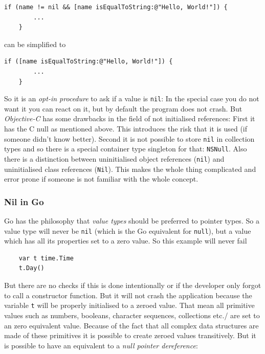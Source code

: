 \documentclass[11pt, a4paper]{report}
\begin{document}
\begin{lstlisting}[language={[Objective]C}]
    if (name != nil && [name isEqualToString:@"Hello, World!"]) {
        ...
    }
\end{lstlisting}

can be simplified to

\begin{lstlisting}[language={[Objective]C}]
    if ([name isEqualToString:@"Hello, World!"]) { 
        ...
    }
\end{lstlisting}

So it is an \textit{opt-in procedure} to ask if a value is \texttt{nil}: In the special case you do not want it you can react on it, but by default the program does not crash. But \textit{Objective-C} has some drawbacks in the field of not initialised references: First it has the C null as mentioned above. This introduces the risk that it is used (if someone didn't know better). Second it is not possible to store \texttt{nil} in collection types and so there is a special container type singleton for that: \texttt{NSNull}. Also there is a distinction between uninitialised object references (\texttt{nil}) and uninitialised class references (\texttt{Nil}). This makes the whole thing complicated and error prone if someone is not familiar with the whole concept.

\subsubsection{Nil in Go}
Go has the philosophy that \textit{value types} should be preferred to pointer types. So a value type will never be \texttt{nil} (which is the Go equivalent for \texttt{null}), but a value which has all its properties set to a zero value\cite{golang-spec}. So this example will never fail

\begin{lstlisting}
    var t time.Time
    t.Day()
\end{lstlisting}

But there are no checks if this is done intentionally or if the developer only forgot to call a constructor function. But it will not crash the application because the variable \texttt{t} will be properly initialised to a zeroed value. That mean all primitive values such as numbers, booleans, character sequences, collections etc./ are set to an zero equivalent value. Because of the fact that all complex data structures are made of these primitives it is possible to create zeroed values transitively. But it is possible to have an equivalent to a \textit{null pointer dereference}:
\end{document}
